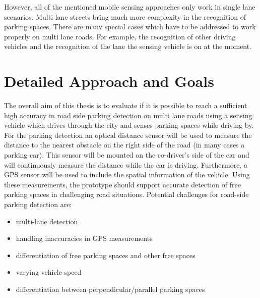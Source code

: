 \documentclass[11pt,a4paper,titlepage,
chapterprefix,headsepline,parskip,pdftex,
,pointlessnumbers,bibtotoc]{article}
\begin{document}
However, all of the mentioned mobile sensing approaches only work in single lane scenarios. Multi lane streets bring much more complexity in the recognition of parking spaces. There are many special cases which have to be addressed to work properly on multi lane roads. For example, the recognition of other driving vehicles and the recognition of the lane the sensing vehicle is on at the moment.




\section{Detailed Approach and Goals}
The overall aim of this thesis is to evaluate if it is possible to reach a sufficient high accuracy in road side parking detection on multi lane roads using a sensing vehicle which drives through the city and senses parking spaces while driving by. 
For the parking detection an optical distance sensor will be used to measure the distance to the nearest obstacle on the right side of the road (in many cases a parking car). This sensor will be mounted on the co-driver's side of the car and will continuously measure the distance while the car is driving. Furthermore, a GPS sensor will be used to include the spatial information of the vehicle. Using these measurements, the prototype should support accurate detection of free parking spaces in challenging road situations. Potential challenges for road-side parking detection are: 
\begin{itemize}
\item multi-lane detection
\item handling inaccuracies in GPS measurements
\item differentiation of free parking spaces and other free spaces
\item varying vehicle speed
\item differentiation between perpendicular/parallel parking spaces
\end{itemize}
\end{document}
